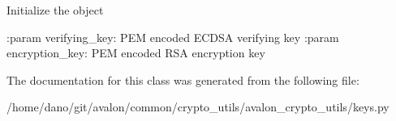 \begin{DoxyVerb}Initialize the object

:param verifying_key: PEM encoded ECDSA verifying key
:param encryption_key: PEM encoded RSA encryption key
\end{DoxyVerb}
 

The documentation for this class was generated from the following file\+:\begin{DoxyCompactItemize}
\item 
/home/dano/git/avalon/common/crypto\+\_\+utils/avalon\+\_\+crypto\+\_\+utils/keys.\+py\end{DoxyCompactItemize}
